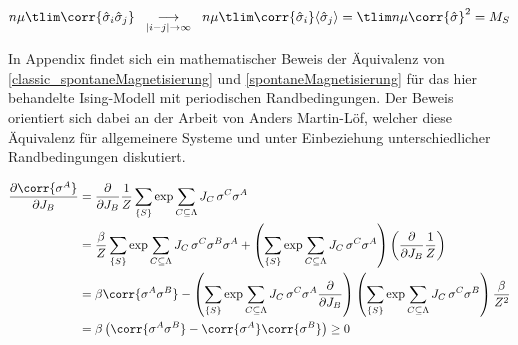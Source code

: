 \begin{equation}
n \mu \tlim \corr{\hat{\sigma}_i\hat{\sigma}_j} \;\; \underset{|i-j| \rightarrow \infty}{\longrightarrow} \;\;n \mu \tlim \corr{\hat{\sigma}_i}\langle\hat{\sigma}_j\rangle =  \tlim n \mu \corr{\hat{\sigma}}^2 = M_S
\end{equation}

\noindent In Appendix findet sich ein mathematischer Beweis der Äquivalenz von \eqref{classic_spontaneMagnetisierung} und \eqref{spontaneMagnetisierung}  für das hier behandelte Ising-Modell mit periodischen Randbedingungen. Der Beweis orientiert sich dabei an der Arbeit \cite{Anders1969} von Anders Martin-Löf, welcher diese Äquivalenz  für allgemeinere Systeme und unter Einbeziehung unterschiedlicher Randbedingungen diskutiert.



\begin{align}
\frac{\partial \corr{\sigma^A}}{\partial J_B} 
&= \frac{\partial }{\partial J_B} \frac{1}{Z} \sum_{\{S\}} \exp{\sum_{C \subseteq \Lambda} J_C\, \sigma^C } \sigma^A \\
&= \frac{\beta}{Z} \sum_{\{S\}} \exp{\sum_{C \subseteq \Lambda} J_C\, \sigma^C } \sigma^B \sigma^A + \left(\sum_{\{S\}} \exp{\sum_{C \subseteq \Lambda} J_C\, \sigma^C } \sigma^A  \right) \left(\frac{\partial }{\partial J_B} \frac{1}{Z} \right)\\
&= \beta\corr{\sigma^A \sigma^B} - \left(\sum_{\{S\}} \exp{\sum_{C \subseteq \Lambda} J_C\, \sigma^C } \sigma^A \frac{\partial }{\partial J_B} \right) \left(\sum_{\{S\}} \exp{\sum_{C \subseteq \Lambda} J_C\, \sigma^C } \sigma^B  \right) \frac{\beta}{Z^2}\\
&= \beta \left(\corr{\sigma^A \sigma^B} - \corr{\sigma^A }\corr{\sigma^B} \right) \geq 0 \label{eq: GKS3}\\
\end{align}

